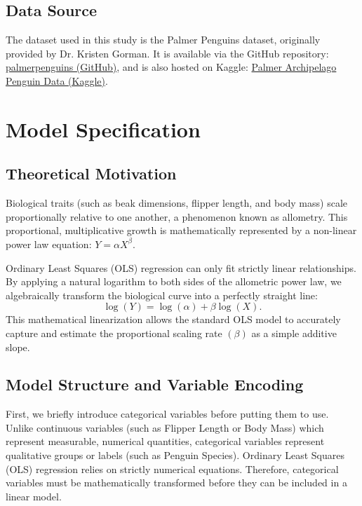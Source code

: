 \documentclass[12pt]{article}
\begin{document}
  \subsection{Data Source}

  The dataset used in this study is the Palmer Penguins\cite{palmerpenguins}
  dataset, originally provided by Dr. Kristen Gorman. It is
  available via the GitHub repository:
  \href{https://github.com/allisonhorst/palmerpenguins/tree/main}
  {palmerpenguins (GitHub)}, and is also hosted on Kaggle:
  \href{https://www.kaggle.com/datasets/parulpandey/palmer-archipelago-antarctica-penguin-data}
  {Palmer Archipelago Penguin Data (Kaggle)}.

  \section{Model Specification}

  \subsection{Theoretical Motivation}

  Biological traits (such as beak dimensions, flipper length,
  and body mass) scale proportionally relative to one another,
  a phenomenon known as allometry.
  This proportional, multiplicative growth is
  mathematically represented by a
  non-linear power law equation: $Y = \alpha X^{\beta}$.

  Ordinary Least Squares (OLS) regression can only
  fit strictly linear relationships.
  By applying a natural logarithm to both sides of the
  allometric power law, we algebraically transform the
  biological curve into a perfectly straight line:
  \[
    \log(Y) = \log(\alpha) + \beta \log(X)
    .\]
  This mathematical linearization allows the standard OLS model
  to accurately capture and estimate the proportional scaling rate
  $(\beta)$ as a simple additive slope.

  \subsection{Model Structure and Variable Encoding}

  First, we briefly introduce categorical variables before putting them
  to use. Unlike continuous variables
  (such as Flipper Length or Body Mass) which represent measurable,
  numerical quantities, categorical variables
  represent qualitative groups or labels (such as Penguin Species).
  Ordinary Least Squares (OLS) regression relies on
  strictly numerical equations.
  Therefore, categorical variables must be mathematically transformed
  before they can be included in a linear model.
\end{document}
